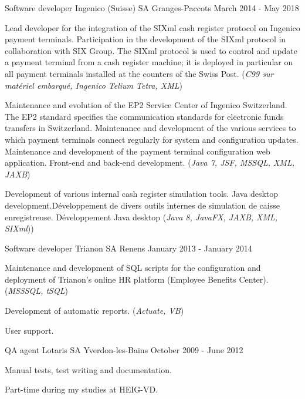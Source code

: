 \begin{cventries}
\cventry
{Software developer} %
{Ingenico (Suisse) SA} %
{Granges-Paccots} %
{March 2014 - May 2018} %
{ %
\begin{cvitems}
\item {Lead developer for the integration of the SIXml cash register protocol on Ingenico payment terminals. Participation in the development of the SIXml protocol in collaboration with SIX Group. The SIXml protocol is used to control and update a payment terminal from a cash register machine; it is deployed in particular on all payment terminals installed at the counters of the Swiss Post. (\emph{C99 sur matériel embarqué, Ingenico Telium Tetra, XML})}
\item {Maintenance and evolution of the EP2 Service Center of Ingenico Switzerland. The EP2 standard specifies the communication standards for electronic funds transfers in Switzerland. Maintenance and development of the various services to which payment terminals connect regularly for system and configuration updates. Maintenance and development of the payment terminal configuration web application. Front-end and back-end development. (\emph{Java 7, JSF, MSSQL, XML, JAXB})}
\item {Development of various internal cash register simulation tools. Java desktop development.Développement de divers outils internes de simulation de caisse enregistreuse. Développement Java desktop (\emph{Java 8, JavaFX, JAXB, XML, SIXml}))}
\end{cvitems}
}


\cventry
{Software developer} %
{Trianon SA} %
{Renens} %
{January 2013 - January 2014} %
{ %
\begin{cvitems}
\item {Maintenance and development of SQL scripts for the configuration and deployment of Trianon's online HR platform (Employee Benefits Center). (\emph{MSSSQL, tSQL})}
\item {Development of automatic reports. (\emph{Actuate, VB})}
\item {User support.}
\end{cvitems} 
}


\cventry
{QA agent} %
{Lotaris SA} %
{Yverdon-les-Bains} %
{October 2009 - June 2012} %
{ %
\begin{cvitems}
\item {Manual tests, test writing and documentation.}
\item {Part-time during my studies at HEIG-VD.}
\end{cvitems}
}


\end{cventries}
